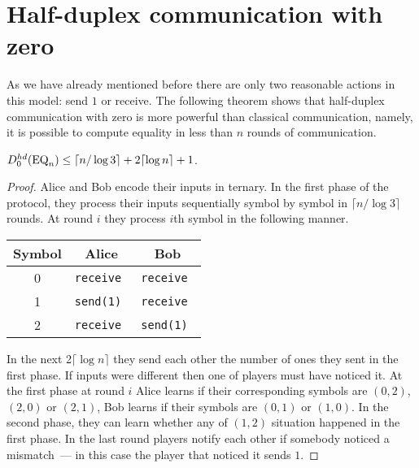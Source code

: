 \section{Half-duplex communication with zero}\label{sec:hdz}
As we have already mentioned before there are only two reasonable actions in this model: send
$1$ or receive. The following theorem shows that half-duplex communication with zero is more
powerful than classical communication, namely, it is possible to compute equality
in less than $n$ rounds of communication. 
\begin{theorem}
$D^{hd}_0(\mathrm{EQ}_n) \le \lceil n/\log 3\rceil + 2\lceil \log n\rceil + 1$.
\end{theorem}
\begin{proof}
Alice and Bob encode their inputs in ternary. 
In the first phase of the protocol, they process their inputs sequentially symbol by symbol in $\lceil n/\log 3\rceil$ rounds. 
At round $i$ they process $i$th symbol in the following manner.
\begin{center}
\begin{tabular}{c|c|c}
\bf Symbol & \bf Alice & \bf Bob \\\hline 
0 & \tt receive  & \tt receive  \\\hline
1 & \tt send(1)  & \tt receive  \\\hline
2 & \tt receive  & \tt send(1) 
\end{tabular}
\end{center}
In the next 2$\lceil \log n\rceil$ they send each other the number of ones 
they sent in the first phase. If inputs were different then one of players must have noticed it.
At the first phase at round $i$ Alice learns if their corresponding symbols 
are $(0, 2)$, $(2,0)$ or $(2,1)$, Bob learns if their symbols are $(0, 1)$ or $(1,0)$.
In the second phase, they can learn whether any of $(1,2)$ situation happened in
the first phase. In the last round players notify each other if somebody
noticed a mismatch~— in this case the player that noticed it sends $1$.
\end{proof}

